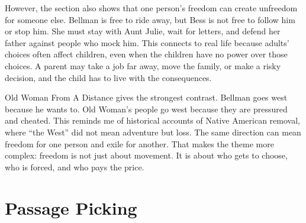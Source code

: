 \documentclass[11pt,a4paper]{article}
\begin{document}
However, the section also shows that one person's freedom can create unfreedom for someone else. Bellman is free to ride away, but Bess is not free to follow him or stop him. She must stay with Aunt Julie, wait for letters, and defend her father against people who mock him. This connects to real life because adults' choices often affect children, even when the children have no power over those choices. A parent may take a job far away, move the family, or make a risky decision, and the child has to live with the consequences.

Old Woman From A Distance gives the strongest contrast. Bellman goes west because he wants to. Old Woman's people go west because they are pressured and cheated. This reminds me of historical accounts of Native American removal, where ``the West'' did not mean adventure but loss. The same direction can mean freedom for one person and exile for another. That makes the theme more complex: freedom is not just about movement. It is about who gets to choose, who is forced, and who pays the price.

\newpage

\section{Passage Picking}
\end{document}
